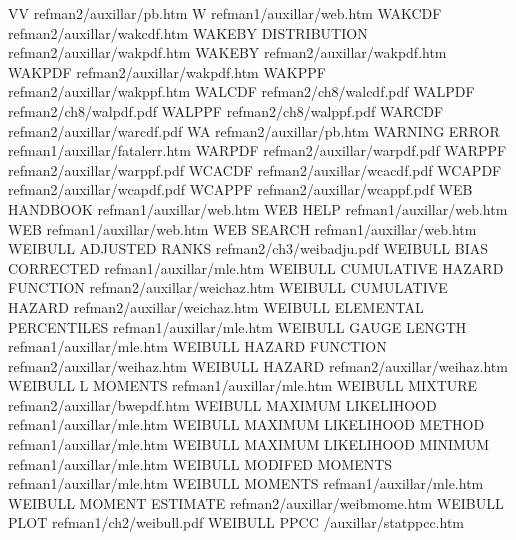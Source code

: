 VV                                      refman2/auxillar/pb.htm
W                                       refman1/auxillar/web.htm
WAKCDF                                  refman2/auxillar/wakcdf.htm
WAKEBY DISTRIBUTION                     refman2/auxillar/wakpdf.htm
WAKEBY                                  refman2/auxillar/wakpdf.htm
WAKPDF                                  refman2/auxillar/wakpdf.htm
WAKPPF                                  refman2/auxillar/wakppf.htm
WALCDF                                  refman2/ch8/walcdf.pdf
WALPDF                                  refman2/ch8/walpdf.pdf
WALPPF                                  refman2/ch8/walppf.pdf
WARCDF                                  refman2/auxillar/warcdf.pdf
WA                                      refman2/auxillar/pb.htm
WARNING ERROR                           refman1/auxillar/fatalerr.htm
WARPDF                                  refman2/auxillar/warpdf.pdf
WARPPF                                  refman2/auxillar/warppf.pdf
WCACDF                                  refman2/auxillar/wcacdf.pdf
WCAPDF                                  refman2/auxillar/wcapdf.pdf
WCAPPF                                  refman2/auxillar/wcappf.pdf
WEB HANDBOOK                            refman1/auxillar/web.htm
WEB HELP                                refman1/auxillar/web.htm
WEB                                     refman1/auxillar/web.htm
WEB SEARCH                              refman1/auxillar/web.htm
WEIBULL ADJUSTED RANKS                  refman2/ch3/weibadju.pdf
WEIBULL BIAS CORRECTED                  refman1/auxillar/mle.htm
WEIBULL CUMULATIVE HAZARD FUNCTION      refman2/auxillar/weichaz.htm
WEIBULL CUMULATIVE HAZARD               refman2/auxillar/weichaz.htm
WEIBULL ELEMENTAL PERCENTILES           refman1/auxillar/mle.htm
WEIBULL GAUGE LENGTH                    refman1/auxillar/mle.htm
WEIBULL HAZARD FUNCTION                 refman2/auxillar/weihaz.htm
WEIBULL HAZARD                          refman2/auxillar/weihaz.htm
WEIBULL L MOMENTS                       refman1/auxillar/mle.htm
WEIBULL MIXTURE                         refman2/auxillar/bwepdf.htm
WEIBULL MAXIMUM LIKELIHOOD              refman1/auxillar/mle.htm
WEIBULL MAXIMUM LIKELIHOOD METHOD       refman1/auxillar/mle.htm
WEIBULL MAXIMUM LIKELIHOOD MINIMUM      refman1/auxillar/mle.htm
WEIBULL MODIFED MOMENTS                 refman1/auxillar/mle.htm
WEIBULL MOMENTS                         refman1/auxillar/mle.htm
WEIBULL MOMENT ESTIMATE                 refman2/auxillar/weibmome.htm
WEIBULL PLOT                            refman1/ch2/weibull.pdf
WEIBULL PPCC                            /auxillar/statppcc.htm
